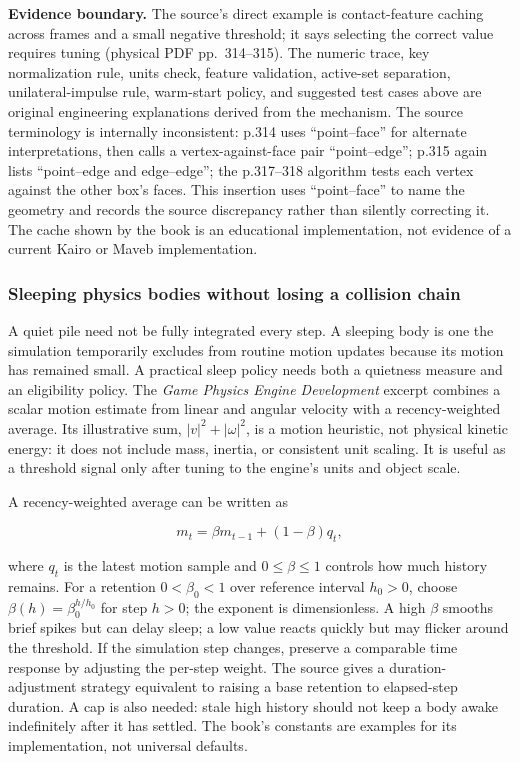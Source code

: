 \textbf{Evidence boundary.} The source's direct example is contact-feature caching across frames and a small negative threshold; it says selecting the correct value requires tuning (physical PDF pp.~314--315). The numeric trace, key normalization rule, units check, feature validation, active-set separation, unilateral-impulse rule, warm-start policy, and suggested test cases above are original engineering explanations derived from the mechanism. The source terminology is internally inconsistent: p.314 uses ``point--face'' for alternate interpretations, then calls a vertex-against-face pair ``point--edge''; p.315 again lists ``point--edge and edge--edge''; the p.317--318 algorithm tests each vertex against the other box's faces. This insertion uses ``point--face'' to name the geometry and records the source discrepancy rather than silently correcting it. The cache shown by the book is an educational implementation, not evidence of a current Kairo or Maveb implementation.

\subsubsection{Sleeping physics bodies without losing a collision chain}\label{sleeping-physics-bodies-without-losing-a-collision-chain}

A quiet pile need not be fully integrated every step. A sleeping body is one the simulation temporarily excludes from routine motion updates because its motion has remained small. A practical sleep policy needs both a quietness measure and an eligibility policy. The \emph{Game Physics Engine Development} excerpt combines a scalar motion estimate from linear and angular velocity with a recency-weighted average. Its illustrative sum, \(|v|^2 + |\omega|^2\), is a motion heuristic, not physical kinetic energy: it does not include mass, inertia, or consistent unit scaling. It is useful as a threshold signal only after tuning to the engine's units and object scale.

A recency-weighted average can be written as

\[m_t = \beta m_{t-1} + (1-\beta)q_t,\]

where \(q_t\) is the latest motion sample and \(0\leq\beta\leq1\) controls how much history remains. For a retention \(0<\beta_0<1\) over reference interval \(h_0>0\), choose \(\beta(h)=\beta_0^{h/h_0}\) for step \(h>0\); the exponent is dimensionless. A high \(\beta\) smooths brief spikes but can delay sleep; a low value reacts quickly but may flicker around the threshold. If the simulation step changes, preserve a comparable time response by adjusting the per-step weight. The source gives a duration-adjustment strategy equivalent to raising a base retention to elapsed-step duration. A cap is also needed: stale high history should not keep a body awake indefinitely after it has settled. The book's constants are examples for its implementation, not universal defaults.

